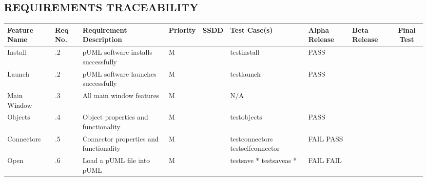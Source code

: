 \documentclass[twoside,letterpaper]{article}
\begin{document}
\begin{landscape}

\section[REQUIREMENTS TRACEABILITY]
  {\bfseries REQUIREMENTS TRACEABILITY}
{\itshape }

\bigskip

\begin{flushleft}
\tablehead{}
\begin{supertabular}[c]{|
                        m{0.9in}|m{0.4in}|m{2.0in}|
                        m{0.4in}|m{0.5in}|m{1.0in}|
                        m{1.0in}|m{1.0in}|c|
                       }
\hline
 
  \centering \bfseries Feature Name &
  \centering \bfseries Req No. &
  \centering \bfseries Requirement Description &
  \centering \bfseries Priority &
  \centering \bfseries SSDD &
  \centering \bfseries Test Case(s) & 
  \centering \bfseries Alpha Release &
  \centering \bfseries Beta Release &
  \bfseries Final Test
\\\hline
  
  Install
  & .2
  & pUML software installs successfully
  & \centering M 
  & ~
  & testinstall
  & PASS
  & ~ 
  & ~ 
\\\hline

  Launch
  & .2
  & pUML software launches successfully
  & \centering M 
  & ~
  & testlaunch
  & PASS
  & ~ 
  & ~ 
\\\hline

  Main Window
  & .3 
  & All main window features 
  & \centering M 
  & ~
  & N/A 
  & ~
  & ~ 
  & ~ 
\\\hline

  Objects
  & .4
  & Object properties and functionality
  & \centering M 
  & ~ 
  & testobjects
  & PASS
  & ~ 
  & ~ 
\\\hline

  Connectors
  & .5
  & Connector properties and functionality
  & \centering M 
  & ~ 
  & testconnectors\newline 
    testselfconnector
  & FAIL \newline
    PASS
  & ~ \newline
    ~
  & ~ \newline
    ~
\\\hline

  Open
  & .6
  & Load a pUML file into pUML 
  & \centering M 
  & ~ 
  & testsave *\newline
    testsaveas *
  & FAIL \newline
    FAIL 
  & ~ \newline
    ~
  & ~ \newline
    ~
\\\hline


\end{supertabular}
\end{flushleft}
\end{landscape}
\end{document}
